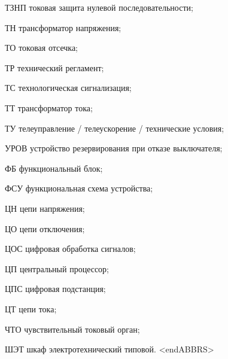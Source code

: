 \begin{list}{}
\item[ТЗНП] токовая защита нулевой последовательности;
\item[ТН] трансформатор напряжения;
\item[ТО] токовая отсечка;
\item[ТР] технический регламент;
\item[ТС] технологическая сигнализация;
\item[ТТ] трансформатор тока;
\item[ТУ] телеуправление / телеускорение / технические условия;
\item[УРОВ] устройство резервирования при отказе выключателя;
\item[ФБ] функциональный блок;
\item[ФСУ] функциональная схема устройства;
\item[ЦН] цепи напряжения;
\item[ЦО] цепи отключения;
\item[ЦОС] цифровая обработка сигналов;
\item[ЦП] центральный процессор;
\item[ЦПС] цифровая подстанция;
\item[ЦТ] цепи тока;
\item[ЧТО] чувствительный токовый орган;
\item[ШЭТ] шкаф электротехнический типовой.
{\color{white}\fontsize{0.1pt}{0.1pt}\selectfont<endABBRS>}
\end{list}

